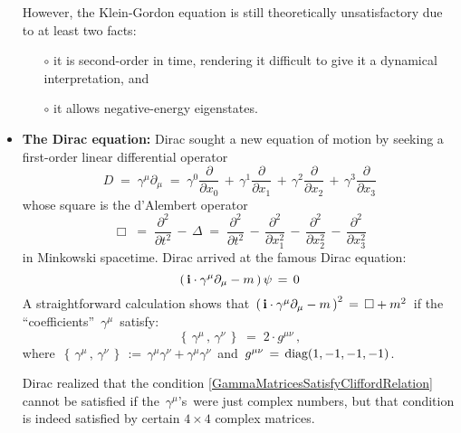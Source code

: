 \begin{itemize}
	However, the Klein-Gordon equation is still theoretically unsatisfactory due to at least two facts:
	\begin{enumerate}
	\item[$\circ$]
		it is second-order in time, rendering it difficult to give it a dynamical interpretation, and
	\item[$\circ$]
		it allows negative-energy eigenstates.
	\end{enumerate}

\item
	\textbf{The Dirac equation:}
	\vskip 0.01cm
	Dirac sought a new equation of motion by seeking a first-order linear differential operator
	\begin{equation*}
	D
	\;=\;
		\gamma^{\mu}\partial_{\mu}
	\;=\;
		\gamma^{0}\dfrac{\partial}{\partial x_{0}} 
		\,+\, \gamma^{1}\dfrac{\partial}{\partial x_{1}} 
		\,+\, \gamma^{2}\dfrac{\partial}{\partial x_{2}} 
		\,+\, \gamma^{3}\dfrac{\partial}{\partial x_{3}} 
	\end{equation*}
	whose square is the d'Alembert operator
	\begin{equation*}
	\Box
	\;=\;
		\dfrac{\partial^{2}}{\partial t^{2}} \,-\, \Delta
	\;=\;
		\dfrac{\partial^{2}}{\partial t^{2}}
		\,-\, \dfrac{\partial^{2}}{\partial x_{1}^{2}}
		\,-\, \dfrac{\partial^{2}}{\partial x_{2}^{2}}
		\,-\, \dfrac{\partial^{2}}{\partial x_{3}^{2}}
	\end{equation*}
	in Minkowski spacetime. 
	Dirac arrived at the famous Dirac equation:
	\begin{equation*}
	\left(\,\textnormal{\bf i}\cdot\gamma^{\mu}\partial_{\mu} - m\,\right)\psi \, = \, 0
	\end{equation*}
	A straightforward calculation shows that
	\,$\left(\,\textnormal{\bf i}\cdot\gamma^{\mu}\partial_{\mu} - m\,\right)^{2} \,=\, \Box + m^{2}$\,
	if the ``coefficients'' \,$\gamma^{\mu}$\, satisfy:
	\begin{equation}
	\label{GammaMatricesSatisfyCliffordRelation}
	\left\{\,\gamma^{\mu}\,,\,\gamma^{\nu}\,\right\}
	\;=\;
		2\cdot g^{\mu\nu}\,,
	\end{equation}
	where
	\,$\left\{\,\gamma^{\mu}\,,\,\gamma^{\nu}\,\right\} \,:=\, \gamma^{\mu}\gamma^{\nu} + \gamma^{\mu}\gamma^{\nu}$\,
	and
	\,$g^{\mu\nu} \,=\, \textnormal{diag}(1,-1,-1,-1)$.\,

	Dirac realized that the condition \eqref{GammaMatricesSatisfyCliffordRelation} cannot be satisfied
	if the \,$\gamma^{\mu}$'s\, were just complex numbers, but that condition is indeed satisfied by
	certain $4 \times 4$ complex matrices.


\end{itemize}
